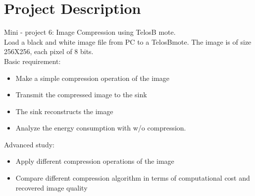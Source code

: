 \chapter{Project Description}
Mini - project  6:  Image Compression using TelosB mote.\\
Load a black and white image file from PC to a TelosBmote. The image is of size 256X256, each pixel of 8 bits.\\

Basic requirement:
\begin{itemize}
\item Make a simple compression operation of the image
\item Transmit the compressed image to the sink
\item The sink reconstructs the image
\item Analyze the energy consumption with w/o compression. 
\end{itemize}

Advanced study:
\begin{itemize}
\item Apply different compression operations of the image
\item Compare different compression algorithm in terms of computational cost and recovered image quality
\end{itemize}